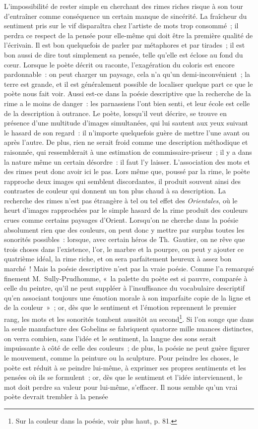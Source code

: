 \documentclass[french,twoside]{book} %
\begin{document}
L’impossibilité de rester simple en cherchant des rimes riches risque à son tour d’entraîner comme conséquence un certain manque de sincérité. La fraîcheur du sentiment pris sur le vif disparaîtra chez l’artiste de mots trop consommé ; il perdra ce respect de la pensée pour elle-même qui doit être la première qualité de l’écrivain. Il est bon quelquefois de parler par métaphores et par tirades ; il est bon aussi de dire tout simplement sa pensée, telle qu’elle est éclose au fond du cœur. Lorsque le poète décrit ou raconte, l’exagération du coloris est encore pardonnable : on peut charger un paysage, cela n’a qu’un demi-inconvénient ; la terre est grande, et il est généralement possible de localiser quelque part ce que le poète nous fait voir. Aussi est-ce dans la poésie descriptive que la recherche de la rime a le moins de danger : les parnassiens l’ont bien senti, et leur école est celle de la description à outrance. Le poète, lorsqu’il veut décrire, se trouve en présence d’une multitude d’images simultanées, qui lui sautent aux yeux suivant le hasard de son regard : il n’importe quelquefois guère de mettre l’une avant ou après l’autre. De plus, rien ne serait froid comme une description méthodique et raisonnée, qui ressemblerait à une estimation de commissaire-priseur ; il y a dans la nature même un certain désordre : il faut l’y laisser. L’association des mots et des rimes peut donc avoir ici le pas. Lors même que, poussé par la rime, le poète rapproche deux images qui semblent discordantes, il produit souvent ainsi des  contrastes de couleur qui donnent un ton plus chaud à sa description. La recherche des rimes n’est pas étrangère à tel ou tel effet des \emph{Orientales}, où le heurt d’images rapprochées par le simple hasard de la rime produit des couleurs crues comme certains paysages d’Orient. Lorsqu’on ne cherche dans la poésie absolument rien que des couleurs, on peut donc y mettre par surplus toutes les sonorités possibles : lorsque, avec certain héros de Th. Gautier, on ne rêve que trois choses dans l’existence, l’or, le marbre et la pourpre, on peut y ajouter ce quatrième idéal, la rime riche, et on sera parfaitement heureux à assez bon marché ! Mais la poésie descriptive n’est pas la vraie poésie. Comme l’a remarqué finement M. Sully-Prudhomme, « la palette du poète est si pauvre, comparée à celle du peintre, qu’il ne peut suppléer à l’insuffisance du vocabulaire descriptif qu’en associant toujours une émotion morale à son imparfaite copie de la ligne et de la couleur » ; or, dès que le sentiment et l’émotion reprennent le premier rang, les mots et les sonorités tombent aussitôt au second\footnote{Sur la couleur dans la poésie, voir plus haut, p. 81.}. Si l’on songe que dans la seule manufacture des Gobelins se fabriquent quatorze mille nuances distinctes, on verra combien, sans l’idée et le sentiment, la langue des sons serait impuissante à côté de celle des couleurs ; de plus, la poésie ne peut guère figurer le mouvement, comme la peinture ou la sculpture. Pour peindre les choses, le poète est réduit à se peindre lui-même, à exprimer ses propres sentiments et les pensées où ils se formulent ; or, dès que le sentiment et l’idée  interviennent, le mot doit perdre sa valeur pour lui-même, s’effacer. Il nous semble qu’un vrai poète devrait trembler à la pensée 
\end{document}
